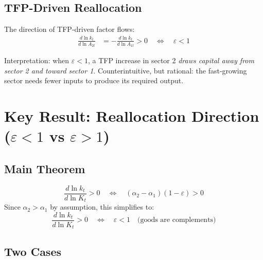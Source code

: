 \documentclass[a4paper,11pt]{article}
\begin{document}
\subsection*{TFP-Driven Reallocation}

The direction of TFP-driven factor flows:
\begin{align*}
\frac{d \ln k_t}{d \ln A_{2t}} &= -\frac{d \ln k_t}{d \ln A_{1t}} > 0 \quad \Longleftrightarrow \quad \varepsilon < 1
\tag{TFP Channel}
\end{align*}

Interpretation: when $\varepsilon < 1$, a TFP increase in sector 2 \emph{draws capital away from sector 2 and toward sector 1}. Counterintuitive, but rational: the fast-growing sector needs fewer inputs to produce its required output.

\clearpage

\section{Key Result: Reallocation Direction ($\varepsilon < 1$ vs $\varepsilon > 1$)}

\subsection*{Main Theorem}

\begin{keyformulabox}[title={Sign of Capital Reallocation}]
\[
\frac{d \ln k_t}{d \ln K_t} > 0 \quad \Longleftrightarrow \quad (\alpha_2 - \alpha_1)(1 - \varepsilon) > 0
\]
Since $\alpha_2 > \alpha_1$ by assumption, this simplifies to:
\[
\frac{d \ln k_t}{d \ln K_t} > 0 \quad \Longleftrightarrow \quad \varepsilon < 1 \quad \text{(goods are complements)}
\]
\end{keyformulabox}

\subsection*{Two Cases}
\end{document}
